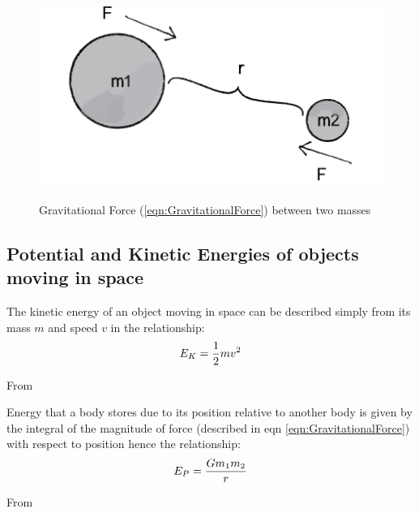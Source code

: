 \documentclass{article}
\begin{document}
       
        \begin{figure}[!ht]
            \centering
            \includegraphics{Figures/GravitationalForce.png}
            \caption{Gravitational Force (\ref{eqn:GravitationalForce}) between two masses}
            \label{fig:GRAVFORCE}
            \cite{GravDiagram}
        \end{figure}

        \subsection{Potential and Kinetic Energies of objects moving in space}
            The kinetic energy of an object moving in space can be described simply from its mass $m$ 
            and speed $v$ in the relationship:
             \begin{equation}
                \centering
                E_{K} = \frac{1}{2}mv^2
                \label{eqn:KineticEnergy}
             \end{equation}
             \begin{flushright}
                 From \cite[s. 4.4]{PHYS1ANOTES}
             \end{flushright}

             \par
             Energy that a body stores due to its position relative to another body is given by the 
             integral of the magnitude of force (described in eqn \ref{eqn:GravitationalForce}) with respect to 
             position hence the relationship:
             \begin{equation}
                \centering
                E_P = \frac{Gm_1m_2}{r}
             \end{equation} 
             \begin{flushright}
                 From \cite[s. 4.6]{PHYS1ANOTES}
             \end{flushright}
\end{document}
